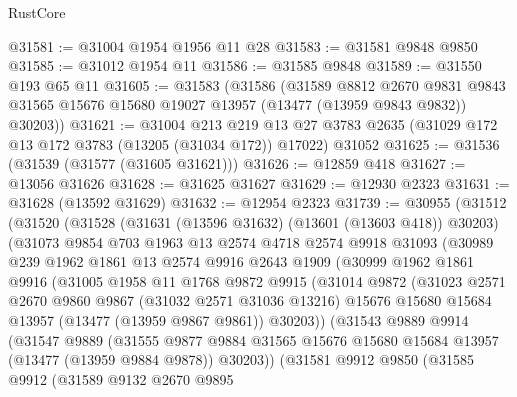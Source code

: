 \begin{lexlean}{RustCore}
\begin{coremodule}
@31581 := @31004 @1954 @1956 @11 @28
@31583 := @31581 @9848 @9850
@31585 := @31012 @1954 @11
@31586 := @31585 @9848
@31589 := @31550 @193 @65 @11
@31605 := @31583
    (@31586
      (@31589
        @8812
        @2670
        @9831
        @9843
        @31565
        @15676
        @15680
        @19027
        @13957
        (@13477 (@13959 @9843 @9832))
        @30203))
@31621 := @31004
    @213
    @219
    @13
    @27
    @3783
    @2635
    (@31029 @172 @13 @172 @3783 (@13205 (@31034 @172)) @17022)
    @31052
@31625 := @31536 (@31539 (@31577 (@31605 @31621)))
@31626 := @12859 @418
@31627 := @13056 @31626
@31628 := @31625 @31627
@31629 := @12930 @2323
@31631 := @31628 (@13592 @31629)
@31632 := @12954 @2323
@31739 := @30955
    (@31512
      (@31520
        (@31528
          (@31631 (@13596 @31632) (@13601 (@13603 @418)) @30203)
          (@31073
            @9854
            @703
            @1963
            @13
            @2574
            @4718
            @2574
            @9918
            @31093
            (@30989
              @239
              @1962
              @1861
              @13
              @2574
              @9916
              @2643
              @1909
              (@30999
                @1962
                @1861
                @9916
                (@31005
                  @1958
                  @11
                  @1768
                  @9872
                  @9915
                  (@31014
                    @9872
                    (@31023
                      @2571
                      @2670
                      @9860
                      @9867
                      (@31032 @2571 @31036 @13216)
                      @15676
                      @15680
                      @15684
                      @13957
                      (@13477 (@13959 @9867 @9861))
                      @30203))
                  (@31543
                    @9889
                    @9914
                    (@31547
                      @9889
                      (@31555
                        @9877
                        @9884
                        @31565
                        @15676
                        @15680
                        @15684
                        @13957
                        (@13477 (@13959 @9884 @9878))
                        @30203))
                    (@31581
                      @9912
                      @9850
                      (@31585
                        @9912
                        (@31589
                          @9132
                          @2670
                          @9895

\end{coremodule}
\end{lexlean}

